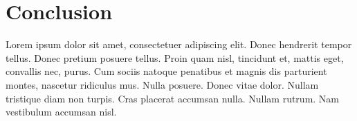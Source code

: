 \documentclass[a4paper,12pt]{article}
\begin{document}
\section{Conclusion}

Lorem ipsum dolor sit amet, consectetuer adipiscing elit.  Donec
hendrerit tempor tellus.  Donec pretium posuere tellus.  Proin quam
nisl, tincidunt et, mattis eget, convallis nec, purus.  Cum sociis
natoque penatibus et magnis dis parturient montes, nascetur ridiculus
mus.  Nulla posuere.  Donec vitae dolor.  Nullam tristique diam non
turpis.  Cras placerat accumsan nulla.  Nullam rutrum.  Nam vestibulum
accumsan nisl.


\nocite{*} %
\printbibliography
\end{document}
